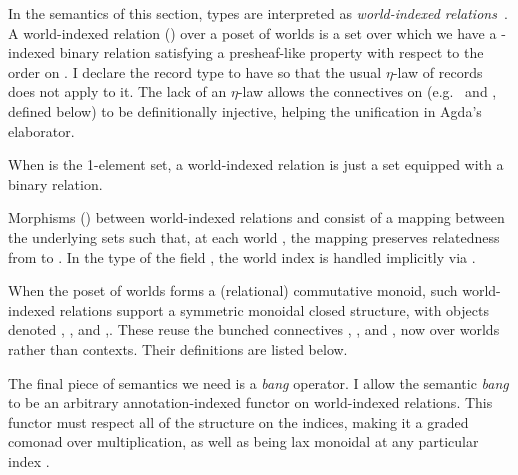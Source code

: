 
In the semantics of this section, types are interpreted as
\emph{world-indexed relations}~\citep{AbelBernardy2020,context-constrained}.
A world-indexed relation () over a poset of worlds
 is a set  over which
we have a -indexed binary relation  satisfying a
presheaf-like property  with respect to the order on
.
I declare the record type  to have
 so that the usual $\eta$-law of records does not
apply to it.
The lack of an $\eta$-law allows the connectives on 
(e.g.\  and ,
defined below) to be definitionally injective, helping the unification in Agda's
elaborator.


\begin{example}
  When  is the 1-element set, a world-indexed relation is just a
  set equipped with a binary relation.
\end{example}

Morphisms () between world-indexed relations 
and  consist of a mapping  between the
underlying sets such that, at each world , the mapping preserves
relatedness from  to .
In the type of the field , the world index is
handled implicitly via \AgdaFunction{\_$\rightarrowtriangle$\_}.


When the poset of worlds forms a (relational) commutative monoid, such
world-indexed relations support a symmetric monoidal closed structure, with
objects denoted ,
, and
,.
These reuse the bunched connectives , \AgdaRecord{$\sep$}, and
\AgdaRecord{$\wand$}, now over worlds rather than contexts.
Their definitions are listed below.


The final piece of semantics we need is a \emph{bang} operator.
I allow the
semantic \emph{bang} to be an arbitrary annotation-indexed functor on
world-indexed relations.
This functor must respect all of the structure on the indices, making it a
graded comonad over multiplication, as well as being lax monoidal at any
particular index .

